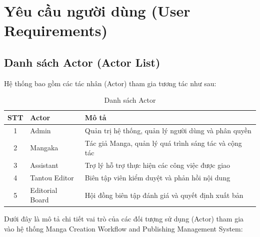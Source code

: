 \section{Yêu cầu người dùng (User Requirements)}
\label{sec:srs_user_requirements}

\subsection{Danh sách Actor (Actor List)}
\label{subsec:srs_actor_list}

Hệ thống bao gồm các tác nhân (Actor) tham gia tương tác như sau:

\begin{table}[H]
\centering
\renewcommand{\arraystretch}{1.3}
\begin{tabularx}{\textwidth}{|c|l|>{\raggedright\arraybackslash}X|}
\hline
\rowcolor{tableheader}
\textbf{STT} & \textbf{Actor} & \textbf{Mô tả} \rule[-1.2ex]{0pt}{4ex} \\ \hline
1 & Admin & Quản trị hệ thống, quản lý người dùng và phân quyền \\ \hline
2 & Mangaka & Tác giả Manga, quản lý quá trình sáng tác và cộng tác \\ \hline
3 & Assistant & Trợ lý hỗ trợ thực hiện các công việc được giao \\ \hline
4 & Tantou Editor & Biên tập viên kiểm duyệt và phản hồi nội dung \\ \hline
5 & Editorial Board & Hội đồng biên tập đánh giá và quyết định xuất bản \\ \hline
\end{tabularx}
\caption{Danh sách Actor}
\label{tab:danh_sach_actor}

\end{table}

Dưới đây là mô tả chi tiết vai trò của các đối tượng sử dụng (Actor) tham gia vào hệ thống Manga Creation Workflow and Publishing Management System:

